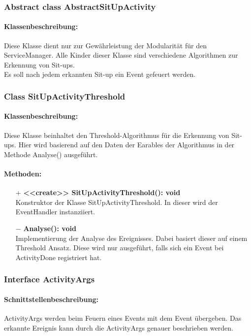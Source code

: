 \documentclass[a4paper,12pt]{article}
\begin{document}
	\subsubsection{Abstract class AbstractSitUpActivity}
	\paragraph{Klassenbeschreibung:}
	Diese Klasse dient nur zur Gewährleistung der Modularität für den ServiceManager. Alle Kinder dieser Klasse sind verschiedene Algorithmen zur Erkennung von Sit-ups.\\ Es soll nach jedem erkannten Sit-up ein Event gefeuert werden.
	
	\subsubsection{Class SitUpActivityThreshold}
	\paragraph{Klassenbeschreibung:}
	Diese Klasse beinhaltet den Threshold-Algorithmus für die Erkennung von Sit-ups. Hier wird basierend auf den Daten der Earables der Algorithmus in der Methode Analyse() ausgeführt.
	\paragraph{Methoden:}
	\begin{itemize}
		\item [+]\textbf{<<create>> SitUpActivityThreshold(): void}\\Konstruktor der Klasse SitUpActivityThreshold. In dieser wird der EventHandler instanziiert. 
		\item [$-$]\textbf{Analyse(): void}\\ Implementierung der Analyse des Ereignisses. Dabei basiert dieser auf einem Threshold Ansatz. Diese wird nur ausgeführt, falls sich ein Event bei ActivityDone registriert hat.
	\end{itemize}
		
	
	\subsubsection{Interface ActivityArgs}
	\paragraph{Schnittstellenbeschreibung:}
	ActivityArgs werden beim Feuern eines Events mit dem Event übergeben. Das erkannte Ereignis kann durch die ActivityArgs genauer beschrieben werden.
	
\end{document}
